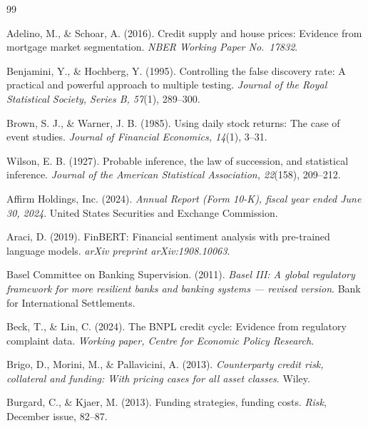 \documentclass[11pt,a4paper]{article}
\begin{document}
\begin{thebibliography}{99}\setlength{\itemsep}{2pt}

Adelino, M., \& Schoar, A. (2016).
Credit supply and house prices: Evidence from mortgage market segmentation.
\textit{NBER Working Paper No.~17832}.

Benjamini, Y., \& Hochberg, Y. (1995).
Controlling the false discovery rate: A practical and powerful approach to multiple testing.
\textit{Journal of the Royal Statistical Society, Series B, 57}(1), 289--300.

Brown, S. J., \& Warner, J. B. (1985).
Using daily stock returns: The case of event studies.
\textit{Journal of Financial Economics, 14}(1), 3--31.

Wilson, E. B. (1927).
Probable inference, the law of succession, and statistical inference.
\textit{Journal of the American Statistical Association, 22}(158), 209--212.

Affirm Holdings, Inc. (2024).
\textit{Annual Report (Form 10-K), fiscal year ended June 30, 2024}.
United States Securities and Exchange Commission.

Araci, D. (2019).
FinBERT: Financial sentiment analysis with pre-trained language models.
\textit{arXiv preprint arXiv:1908.10063}.

Basel Committee on Banking Supervision. (2011).
\textit{Basel III: A global regulatory framework for more resilient banks and banking systems --- revised version}.
Bank for International Settlements.

Beck, T., \& Lin, C. (2024).
The BNPL credit cycle: Evidence from regulatory complaint data.
\textit{Working paper, Centre for Economic Policy Research}.

Brigo, D., Morini, M., \& Pallavicini, A. (2013).
\textit{Counterparty credit risk, collateral and funding: With pricing cases for all asset classes}.
Wiley.

Burgard, C., \& Kjaer, M. (2013).
Funding strategies, funding costs.
\textit{Risk}, December issue, 82--87.


\end{thebibliography}
\end{document}
